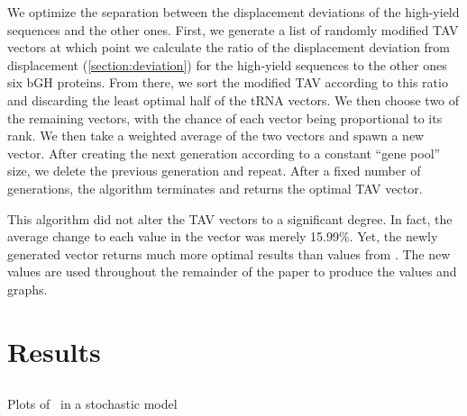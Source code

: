 \documentclass[12pt]{article}
\numberwithin{equation}{section}
\begin{document}
We optimize the separation between the displacement deviations of the 
high-yield sequences and the other ones.  
First, we generate a list of randomly modified TAV vectors at which
point we calculate the ratio of the displacement deviation from
displacement (\autoref{section:deviation}) for the high-yield sequences to the other ones
six bGH proteins. From there, we sort the modified TAV according to
this ratio and discarding the least optimal half of the tRNA
vectors. We then choose two of the remaining vectors, with the chance
of each vector being proportional to its rank.  We then take a
weighted average of the two vectors and spawn a new vector.  After
creating the next generation according to a constant ``gene pool''
size, we delete the previous generation and repeat. After a fixed
number of generations, the algorithm terminates and returns the
optimal TAV vector.

This algorithm did not alter the TAV vectors to a significant degree.
In fact, the average change to each value in the vector was merely
15.99\%.  Yet, the newly generated vector returns much more optimal
results than values from \citeauthor{lalit:embs}.  The new values
are used throughout the remainder of the paper to produce the 
values and graphs.

\section{Results}
\subsection{\prfB}

\begin{cfigure}
  \caption{Plots of \prfB\ in a stochastic model}
  \label{prfB:stochplots}
\end{cfigure}
\end{document}
